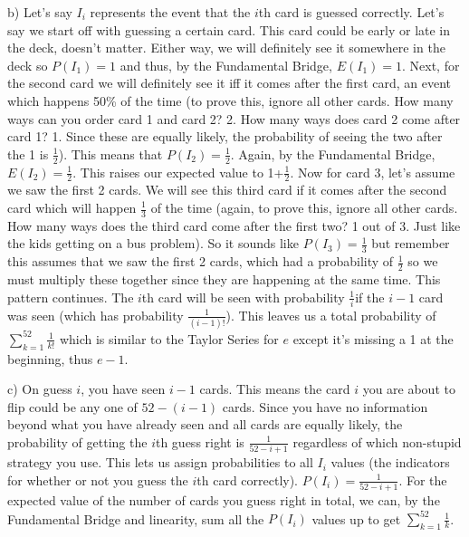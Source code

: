 \documentclass[11pt]{article}
\begin{document}
\smallskip	
    b) Let's say $I_i$ represents the event that the $i$th card is guessed correctly.  Let's say we start off with guessing a certain card.  This card could be early or late in the deck, doesn't matter. Either way, we will definitely see it somewhere in the deck so $P(I_1) = 1$ and thus, by the Fundamental Bridge, $E(I_1)=1$.  Next, for the second card we will definitely see it iff it comes after the first card, an event which happens 50\% of the time (to prove this, ignore all other cards.  How many ways can you order card 1 and card 2? 2.  How many ways does card 2 come after card 1? 1.  Since these are equally likely, the probability of seeing the two after the 1 is $\frac{1}{2}$).  This means that $P(I_2)=\frac{1}{2}$.  Again, by the Fundamental Bridge, $E(I_2)=\frac{1}{2}$.  This raises our expected value to 1+$\frac{1}{2}$. Now for card 3, let's assume we saw the first 2 cards.  We will see this third card if it comes after the second card which will happen $\frac{1}{3}$ of the time (again, to prove this, ignore all other cards.  How many ways does the third card come after the first two? 1 out of 3.  Just like the kids getting on a bus problem).  So it sounds like $P(I_3)=\frac{1}{3}$ but remember this assumes that we saw the first 2 cards, which had a probability of $\frac{1}{2}$ so we must multiply these together since they are happening at the same time.  This pattern continues.  The $i$th card will be seen with probability $\frac{1}{i}$if the $i-1$ card was seen (which has probability $\frac{1}{(i-1)!}$).  This leaves us a total probability of $\sum\limits_{k=1}^{52} \frac{1}{k!}$ which is similar to the Taylor Series for $e$ except it's missing a 1 at the beginning, thus $\boxed{e-1}$.\\
    \smallskip

    c) On guess $i$, you have seen $i-1$ cards.  This means the card $i$ you are about to flip could be any one of $52-(i-1)$ cards.  Since you have no information beyond what you have already seen and all cards are equally likely, the probability of getting the $i$th guess right is $\frac{1}{52-i+1}$ regardless of which non-stupid strategy you use.  This lets us assign probabilities to all $I_i$ values (the indicators for whether or not you guess the $i$th card correctly).  $P(I_i)=\frac{1}{52-i+1}$.  For the expected value of the number of cards you guess right in total, we can, by the Fundamental Bridge and linearity, sum all the $P(I_i)$ values up to get $\boxed{\sum\limits_{k=1}^{52} \frac{1}{k}}$.\\
\bigskip
\end{document}
